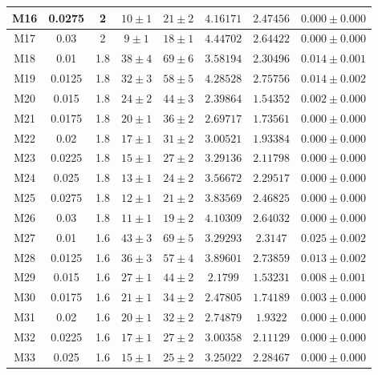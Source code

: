 \documentclass[12pt,a4paper]{report}
\begin{document}
\begin{center}
\begin{longtable}{||c|c|c|c|c|c|c|c||}
M16 & 0.0275 & 2 & $ 10 \pm 1 $ & $ 21 \pm 2 $ & $ 4.16171 $ & $ 2.47456 $ & $ 0.000 \pm 0.000 $ \\ \hline
M17 & 0.03 & 2 & $ 9 \pm 1 $ & $ 18 \pm 1 $ & $ 4.44702 $ & $ 2.64422 $ & $ 0.000 \pm 0.000 $ \\ \hline
M18 & 0.01 & 1.8 & $ 38 \pm 4 $ & $ 69 \pm 6 $ & $ 3.58194 $ & $ 2.30496 $ & $ 0.014 \pm 0.001 $ \\ \hline
M19 & 0.0125 & 1.8 & $ 32 \pm 3 $ & $ 58 \pm 5 $ & $ 4.28528 $ & $ 2.75756 $ & $ 0.014 \pm 0.002 $ \\ \hline
M20 & 0.015 & 1.8 & $ 24 \pm 2 $ & $ 44 \pm 3 $ & $ 2.39864 $ & $ 1.54352 $ & $ 0.002 \pm 0.000 $ \\ \hline
M21 & 0.0175 & 1.8 & $ 20 \pm 1 $ & $ 36 \pm 2 $ & $ 2.69717 $ & $ 1.73561 $ & $ 0.000 \pm 0.000 $ \\ \hline
M22 & 0.02 & 1.8 & $ 17 \pm 1 $ & $ 31 \pm 2 $ & $ 3.00521 $ & $ 1.93384 $ & $ 0.000 \pm 0.000 $ \\ \hline
M23 & 0.0225 & 1.8 & $ 15 \pm 1 $ & $ 27 \pm 2 $ & $ 3.29136 $ & $ 2.11798 $ & $ 0.000 \pm 0.000 $ \\ \hline
M24 & 0.025 & 1.8 & $ 13 \pm 1 $ & $ 24 \pm 2 $ & $ 3.56672 $ & $ 2.29517 $ & $ 0.000 \pm 0.000 $ \\ \hline
M25 & 0.0275 & 1.8 & $ 12 \pm 1 $ & $ 21 \pm 2 $ & $ 3.83569 $ & $ 2.46825 $ & $ 0.000 \pm 0.000 $ \\ \hline
M26 & 0.03 & 1.8 & $ 11 \pm 1 $ & $ 19 \pm 2 $ & $ 4.10309 $ & $ 2.64032 $ & $ 0.000 \pm 0.000 $ \\ \hline
M27 & 0.01 & 1.6 & $ 43 \pm 3 $ & $ 69 \pm 5 $ & $ 3.29293 $ & $ 2.3147 $ & $ 0.025 \pm 0.002 $ \\ \hline
M28 & 0.0125 & 1.6 & $ 36 \pm 3 $ & $ 57 \pm 4 $ & $ 3.89601 $ & $ 2.73859 $ & $ 0.013 \pm 0.002 $ \\ \hline
M29 & 0.015 & 1.6 & $ 27 \pm 1 $ & $ 44 \pm 2 $ & $ 2.1799 $ & $ 1.53231 $ & $ 0.008 \pm 0.001 $ \\ \hline
M30 & 0.0175 & 1.6 & $ 21 \pm 1 $ & $ 34 \pm 2 $ & $ 2.47805 $ & $ 1.74189 $ & $ 0.003 \pm 0.000 $ \\ \hline
M31 & 0.02 & 1.6 & $ 20 \pm 1 $ & $ 32 \pm 2 $ & $ 2.74879 $ & $ 1.9322 $ & $ 0.000 \pm 0.000 $ \\ \hline
M32 & 0.0225 & 1.6 & $ 17 \pm 1 $ & $ 27 \pm 2 $ & $ 3.00358 $ & $ 2.11129 $ & $ 0.000 \pm 0.000 $ \\ \hline
M33 & 0.025 & 1.6 & $ 15 \pm 1 $ & $ 25 \pm 2 $ & $ 3.25022 $ & $ 2.28467 $ & $ 0.000 \pm 0.000 $ \\ \hline

\end{longtable}
\end{center}
\end{document}
